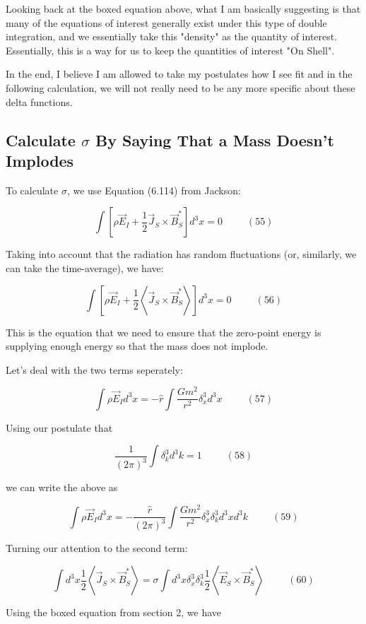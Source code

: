 \documentclass {article}
\begin{document}
Looking back at the boxed equation above, what I am basically suggesting is that many of the equations of interest generally exist under this type of double integration, and we essentially take this "density" as the quantity of interest. Essentially, this is a way for us to keep the quantities of interest "On Shell".

In the end, I believe I am allowed to take my postulates how I see fit and in the following calculation, we will not really need to be any more specific about these delta functions. 

\subsection{Calculate $\sigma$ By Saying That a Mass Doesn't Implodes}

To calculate $\sigma$, we use Equation (6.114) from Jackson:

$$\int \left[ \rho \vec E_I +  \frac 1 2 \vec J_S \times \vec B_S^* \right]d^3x = 0 ~~~~~~~~~~~ (55)$$

Taking into account that the radiation has random fluctuations (or, similarly, we can take the time-average), we have:

$$\int \left[ \rho \vec E_I +  \frac 1 2 \left< \vec J_S \times \vec B_S^* \right> \right]d^3x = 0 ~~~~~~~~~~~ (56)$$

This is the equation that we need to ensure that the zero-point energy is supplying enough energy so that the mass does not implode.

Let's deal with the two terms seperately:

$$\int \rho \vec E_I d^3x = -\hat r \int \frac {Gm^2}{r^2} \delta^3_x d^3x ~~~~~~~~~~~ (57)$$

Using our postulate that 

$$\frac 1 {(2 \pi)^3} \int \delta^3_k d^3k = 1 ~~~~~~~~~~~ (58)$$

we can write the above as

$$\int \rho \vec E_I d^3x = -\frac {\hat r}{(2 \pi)^3} \int \frac {Gm^2}{r^2} \delta^3_x  \delta^3_k d^3x d^3k ~~~~~~~~~~~ (59)$$

Turning our attention to the second term:

$$\int d^3x \frac 1 2 \left< \vec J_S \times \vec B_S^* \right>  = \sigma \int d^3x \delta^3_x \delta^3_k \frac 1 2 \left< \vec E_S \times \vec B_S^* \right>  ~~~~~~~~~~~ (60)$$

Using the boxed equation from section 2, we have
\end{document}
